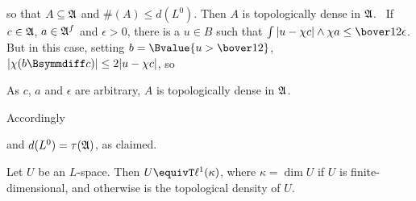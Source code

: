 {

\noindent so that $A\subseteq\frak A$ and $\#(A)\le d(L^0)$.   Then $A$
is topologically dense in $\frak A$.   \Prf\ If $c\in\frak A$,
$a\in\frak A^f$ and $\epsilon>0$, there is a $u\in B$ such that
$\int|u-\chi c|\wedge\chi a\le\bover12\epsilon$.   But in this case,
setting $b=\Bvalue{u>\bover12}$, $|\chi(b\Bsymmdiff c)|\le 2|u-\chi c|$,
so


\noindent As $c$, $a$ and $\epsilon$ are arbitrary, $A$ is topologically
dense in $\frak A$.\ \Qed

Accordingly


\noindent and $d(L^0)=\tau(\frak A)$, as claimed.
}%

 Let $U$ be an
$L$-space.   Then $U\equivT\ell^1(\kappa)$, where $\kappa=\dim U$ if $U$
is finite-dimensional, and otherwise is the topological density of $U$.

